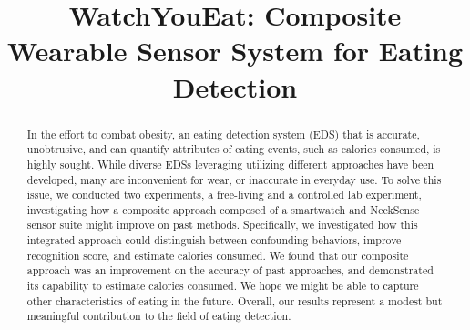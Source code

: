 \documentclass[conference]{IEEEtran}
\begin{document}
\title{WatchYouEat: Composite Wearable Sensor System for Eating Detection\\}

\author{
\and
{}
\and
{}
\and
{}

}

\maketitle

\begin{abstract}
In the effort to combat obesity, an eating detection system (EDS) that is accurate, unobtrusive, and can quantify attributes of eating events, such as calories consumed, is highly sought. While diverse EDSs leveraging utilizing different approaches have been developed, many are inconvenient for wear, or inaccurate in everyday use. To solve this issue, we conducted two experiments, a free-living and a controlled lab experiment, investigating how a composite approach composed of a smartwatch and NeckSense sensor suite might improve on past methods. Specifically, we investigated how this integrated approach could distinguish between confounding behaviors, improve recognition score, and estimate calories consumed. We found that our composite approach was an improvement on the accuracy of past approaches, and demonstrated its capability to estimate calories consumed. We hope we might be able to capture other characteristics of eating in the future. Overall, our results represent a modest but meaningful contribution to the field of eating detection.
\end{abstract}
\end{document}
